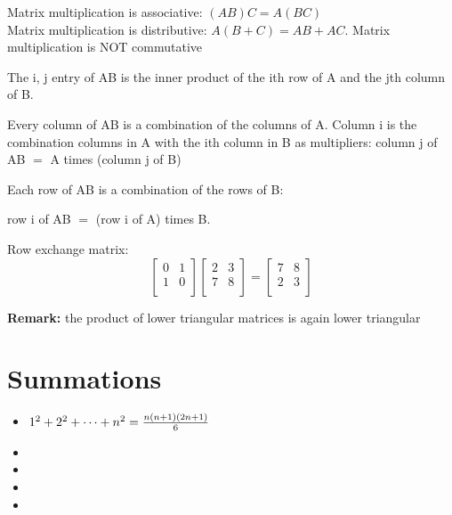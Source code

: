 \documentclass[12pt]{article}
\newcommand{\rmk}[1]{\par {\bf Remark: }{#1}}
\begin{document}
\begin{theorem}
  Matrix multiplication is associative: $(AB)C = A(BC)$\\
  Matrix multiplication is distributive: $A(B + C) = AB + AC$.
  Matrix multiplication is NOT commutative
\end{theorem}
\begin{theorem}
  The i, j entry of AB is the inner product of the ith row of A and
  the jth column of B.
  
  Every column of AB is a combination of the columns of A. Column i is
  the combination columns in A with the ith column in B as
  multipliers: column j of AB $=$ A times (column j of B)
  
  Each row of AB is a combination of the rows of B: 

  row i of AB $=$ (row i of A) times B.
\end{theorem}
\begin{definition}Row exchange matrix:\\
  $$\begin{bmatrix}
  0 & 1\\
  1 & 0\\
  \end{bmatrix}
  \begin{bmatrix}
  2 & 3\\
  7 & 8\\
  \end{bmatrix}
  = 
  \begin{bmatrix}
  7 & 8\\
  2 & 3\\
  \end{bmatrix}
  $$

\end{definition}
\rmk{the product of lower triangular matrices is again lower
  triangular}
\section{Summations}
\begin{itemize}
\item $1^2 + 2^2 + \dots + n^2 = {n(n + 1)(2n + 1) \over 6}$
\item 
\item 
\item 
\item 
\end{itemize}

\pagebreak

\end{document}
